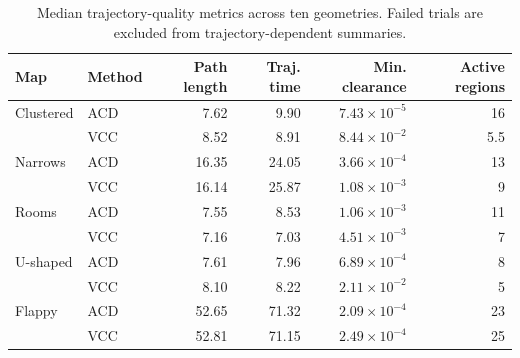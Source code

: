 \begin{table}[htbp]
\caption{Median trajectory-quality metrics across ten geometries. Failed trials are excluded from trajectory-dependent summaries.}
\label{tab:exp-quality}
\centering
\scriptsize
\setlength{\tabcolsep}{4.0pt}
\begin{tabular}{@{}llrrrr@{}}
\toprule
Map & Method & Path length & Traj. time & Min. clearance & Active regions \\
\midrule
Clustered & ACD & 7.62 & 9.90 & $7.43{\times}10^{-5}$ & 16 \\
          & VCC & 8.52 & 8.91 & $8.44{\times}10^{-2}$ & 5.5 \\
Narrows   & ACD & 16.35 & 24.05 & $3.66{\times}10^{-4}$ & 13 \\
          & VCC & 16.14 & 25.87 & $1.08{\times}10^{-3}$ & 9 \\
Rooms     & ACD & 7.55 & 8.53 & $1.06{\times}10^{-3}$ & 11 \\
          & VCC & 7.16 & 7.03 & $4.51{\times}10^{-3}$ & 7 \\
U-shaped  & ACD & 7.61 & 7.96 & $6.89{\times}10^{-4}$ & 8 \\
          & VCC & 8.10 & 8.22 & $2.11{\times}10^{-2}$ & 5 \\
Flappy    & ACD & 52.65 & 71.32 & $2.09{\times}10^{-4}$ & 23 \\
          & VCC & 52.81 & 71.15 & $2.49{\times}10^{-4}$ & 25 \\
\bottomrule
\end{tabular}
\end{table}

